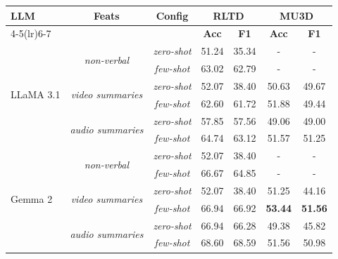 \begin{table}
\centering
\small
\begin{tabular}{l c c cc cc}
\toprule
\textbf{LLM} & \textbf{Feats} & \textbf{Config} 
  & \multicolumn{2}{c}{\textbf{RLTD}} 
  & \multicolumn{2}{c}{\textbf{MU3D}} \\
\cmidrule(lr){4-5}\cmidrule(lr){6-7}
 & & & \textbf{Acc} & \textbf{F1} & \textbf{Acc} & \textbf{F1} \\
\midrule

\multirow{6}{*}{LLaMA 3.1} 
 & \multirow{2}{*}{\textit{non-verbal}}
   & \textit{zero-shot}
     & 51.24 & 35.34 
     & - & -  \\
 & 
   & \textit{\textit{few-shot}}
     & 63.02 & 62.79
     & - & -  \\
\cmidrule(lr){2-7}
 & \multirow{2}{*}{\textit{video summaries}}
   & \textit{zero-shot}
     & 52.07 & 38.40
     & 50.63 & 49.67 \\
 &
   & \textit{\textit{few-shot}}
     & 62.60 & 61.72 
     & 51.88 & 49.44 \\
\cmidrule(lr){2-7}
 & \multirow{2}{*}{\textit{audio summaries}}
   & \textit{zero-shot}
     & 57.85 & 57.56
     & 49.06 & 49.00 \\
 &
   & \textit{\textit{few-shot}}
     & 64.74 & 63.12
     & 51.57 & 51.25 \\
\midrule

\multirow{6}{*}{Gemma 2} 
 & \multirow{2}{*}{\textit{non-verbal}}
   & \textit{zero-shot}
     & 52.07 & 38.40 
     & - & -  \\
 & 
   & \textit{\textit{few-shot}}
     & 66.67 & 64.85
     & - & -  \\
\cmidrule(lr){2-7}
 & \multirow{2}{*}{\textit{video summaries}}
   & \textit{zero-shot}
     & 52.07 & 38.40 
     & 51.25 & 44.16 \\
 &
   & \textit{\textit{few-shot}}
     & 66.94 & 66.92 
     & \textbf{53.44} & \textbf{51.56} \\
\cmidrule(lr){2-7}
 & \multirow{2}{*}{\textit{audio summaries}}
   & \textit{zero-shot}
     & 66.94 & 66.28
     & 49.38 & 45.82 \\
 &
   & \textit{\textit{few-shot}}
     & 68.60 & 68.59
     & 51.56 & 50.98 \\
\midrule


\end{tabular}
\end{table}
